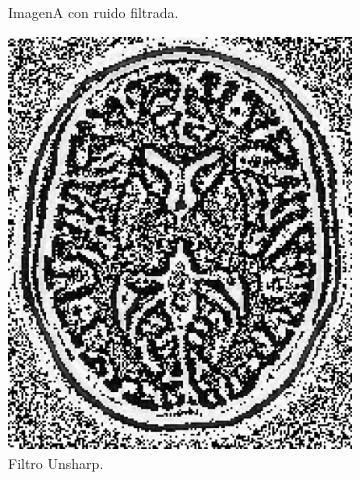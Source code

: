 \documentclass[11pt,twocolumn,twoside]{opticajnl}
\begin{document}
\begin{figure}[h]
\begin{subfigure}[h]{0.32\linewidth}
            \caption{ImagenA con ruido filtrada.} 
         \end{subfigure}
         \begin{subfigure}[h]{0.32\linewidth}
            \centering
            \includegraphics[width=\textwidth]{Figuras/unsharp.png}
            \caption{Filtro Unsharp.} 
         \end{subfigure}
         \begin{subfigure}[h]{0.32\linewidth}
            \centering

\end{subfigure}
\end{figure}
\end{document}
